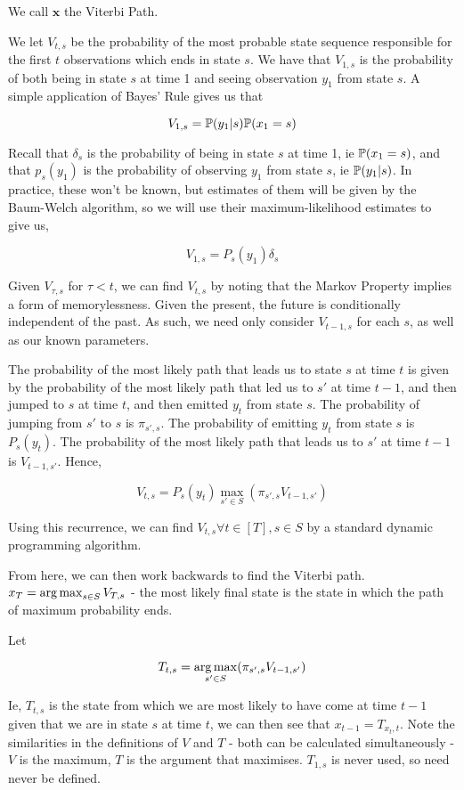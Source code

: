 We call $\mathbf{x}$ the Viterbi Path.

We let $V_{t,s}$ be the probability of the most probable state sequence responsible for the first $t$ observations which ends in state $s$. We have that $V_{1,s}$ is the probability of both being in state $s$ at time 1 and seeing observation $y_1$ from state $s$. A simple application of Bayes' Rule gives us that

$$
V_{1,s} = \mathbb{P} (y_1|s)\mathbb{P}(x_1=s)
$$

Recall that $\delta_s$ is the probability of being in state $s$ at time 1, ie $\mathbb{P}(x_1=s)$, and that $p_s(y_1)$ is the probability of observing $y_1$ from state $s$, ie $\mathbb{P} (y_1|s)$. In practice, these won't be known, but estimates of them will be given by the Baum-Welch algorithm, so we will use their maximum-likelihood estimates to give us,

$$
V_{1,s} = P_s(y_1)\delta_s
$$

Given $V_{\tau,s}$ for $\tau < t$, we can find $V_{t,s}$ by noting that the Markov Property implies a form of memorylessness. Given the present, the future is conditionally independent of the past. As such, we need only consider $V_{t-1,s}$ for each $s$, as well as our known parameters. 

The probability of the most likely path that leads us to state $s$ at time $t$ is given by the probability of the most likely path that led us to $s'$ at time $t-1$, and then jumped to $s$ at time $t$, and then emitted $y_t$ from state $s$. The probability of jumping from $s'$ to $s$ is $\pi_{s',s}$. The probability of emitting $y_t$ from state $s$ is $P_s(y_t)$. The probability of the most likely path that leads us to $s'$ at time $t-1$ is $V_{t-1,s'}$. Hence,

$$
V_{t,s} = P_s(y_t) \max_{s'\in S} (\pi_{s',s}V_{t-1,s'})
$$

Using this recurrence, we can find $V_{t,s} \forall t \in [T], s \in S$ by a standard dynamic programming algorithm.

From here, we can then work backwards to find the Viterbi path. $x_T = \operatorname*{arg\,max}_{s \in S} V_{T,s}$ - the most likely final state is the state in which the path of maximum probability ends.

Let
 
$$
T_{t,s} = \operatorname*{arg\,max}_{s'\in S}(\pi_{s',s}V_{t-1,s'})
$$

Ie, $T_{t,s}$ is the state from which we are most likely to have come at time $t-1$ given that we are in state $s$ at time $t$, we can then see that $x_{t-1} = T_{x_t,t}$. Note the similarities in the definitions of $V$ and $T$ - both can be calculated simultaneously - $V$ is the maximum, $T$ is the argument that maximises. $T_{1,s}$ is never used, so need never be defined. 


